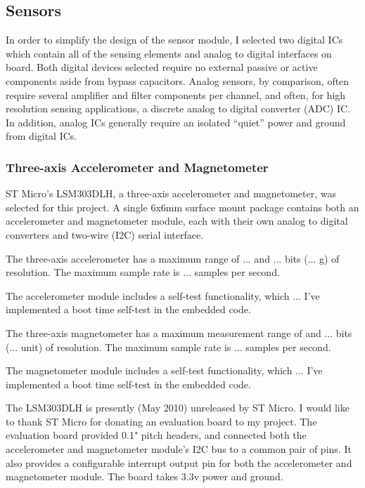 \documentclass[12pt]{report}
\begin{document}
\subsection{Sensors}
In order to simplify the design of the sensor module, I selected two digital ICs which contain all of the sensing elements and analog to digital interfaces on board. 
Both digital devices selected require no external passive or active components aside from bypass capacitors. Analog sensors, by comparison, often require several amplifier and filter components per channel, and often, for high resolution sensing applications, a discrete analog to digital converter (ADC) IC. In addition, analog ICs generally require an isolated ``quiet'' power and ground from digital ICs. 

\subsubsection{Three-axis Accelerometer and Magnetometer}
ST Micro's LSM303DLH, a three-axis accelerometer and magnetometer, was selected for this project. A single 6x6mm surface mount package contains both an accelerometer and magnetometer module, each with their own analog to digital converters and two-wire (I2C) serial interface. 

The three-axis accelerometer has a maximum range of 
... and ... bits (... g) of resolution. The maximum sample rate is ... samples per second.

The accelerometer module includes a self-test functionality, which ...
I've implemented a boot time self-test in the embedded code.

The three-axis magnetometer has a maximum measurement range of  and ... bits (... unit) of resolution. The maximum sample rate is ... samples per second. 

The magnetometer module includes a self-test functionality, which ...
I've implemented a boot time self-test in the embedded code.

The LSM303DLH is presently (May 2010) unreleased by ST Micro. I would like to thank ST Micro for donating an evaluation board to my project. The evaluation board provided 0.1" pitch headers, and connected both the accelerometer and magnetometer module's I2C bus to a common pair of pins. It also provides a configurable interrupt output pin for both the accelerometer and magnetometer module. The board takes 3.3v power and ground.

\end{document}
